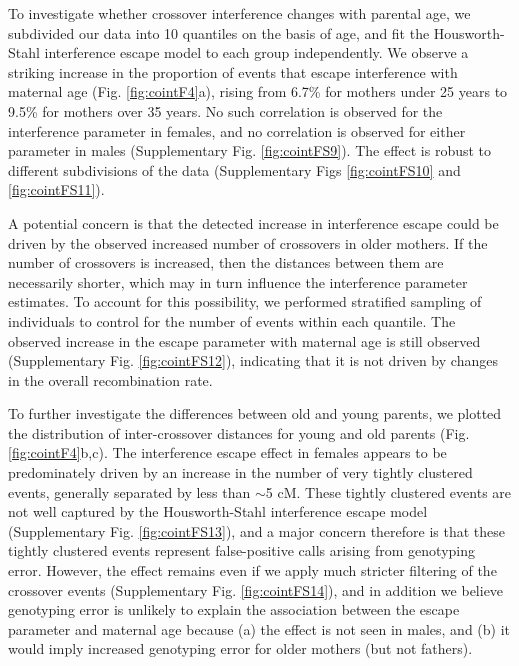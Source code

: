 To investigate whether crossover interference changes with
parental age, we subdivided our data into 10 quantiles on the
basis of age, and fit the Housworth-Stahl interference escape
model to each group independently. We observe a striking
increase in the proportion of events that escape interference with
maternal age (Fig. \ref{fig:cointF4}a), rising from 6.7\% for mothers under 25
years to 9.5\% for mothers over 35 years. No such correlation is
observed for the interference parameter in females, and no
correlation is observed for either parameter in males
(Supplementary Fig. \ref{fig:cointFS9}). The effect is robust to different subdivisions %
of the data (Supplementary Figs \ref{fig:cointFS10} and \ref{fig:cointFS11}).

A potential concern is that the detected increase in interference
escape could be driven by the observed increased number of
crossovers in older mothers. If the number of crossovers is 
increased, then the distances between them are necessarily
shorter, which may in turn influence the interference parameter
estimates. To account for this possibility, we performed stratified
sampling of individuals to control for the number of events
within each quantile. The observed increase in the escape
parameter with maternal age is still observed (Supplementary
Fig. \ref{fig:cointFS12}), indicating that it is not driven by changes in the overall
recombination rate.

To further investigate the differences between old and young
parents, we plotted the distribution of inter-crossover distances
for young and old parents (Fig. \ref{fig:cointF4}b,c). The interference escape
effect in females appears to be predominately driven by an
increase in the number of very tightly clustered events, generally
separated by less than $\sim$5 cM. These tightly clustered events are
not well captured by the Housworth-Stahl interference escape
model (Supplementary Fig. \ref{fig:cointFS13}), and a major concern therefore is
that these tightly clustered events represent false-positive calls
arising from genotyping error. However, the effect remains even
if we apply much stricter filtering of the crossover events
(Supplementary Fig. \ref{fig:cointFS14}), and in addition we believe genotyping
error is unlikely to explain the association between the escape
parameter and maternal age because (a) the effect is not seen in
males, and (b) it would imply increased genotyping error for
older mothers (but not fathers).

